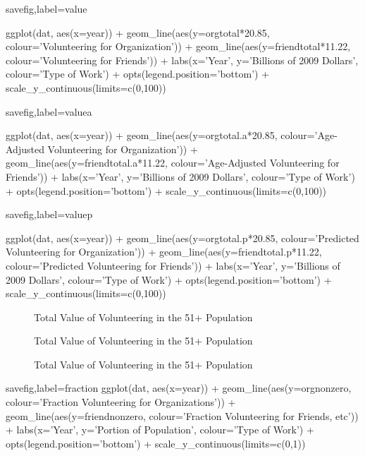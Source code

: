 \documentclass{article}
\begin{document}
\begin{Rcode}{savefig,label=value}

ggplot(dat, aes(x=year)) + 
geom_line(aes(y=orgtotal*20.85, colour='Volunteering for Organization')) + 
geom_line(aes(y=friendtotal*11.22, colour='Volunteering for Friends')) + 
labs(x='Year', y='Billions of 2009 Dollars', colour='Type of Work') + opts(legend.position='bottom') +
scale_y_continuous(limits=c(0,100))
\end{Rcode}

\begin{Rcode}{savefig,label=valuea}

ggplot(dat, aes(x=year)) + 
geom_line(aes(y=orgtotal.a*20.85, colour='Age-Adjusted Volunteering for Organization')) + 
geom_line(aes(y=friendtotal.a*11.22, colour='Age-Adjusted Volunteering for Friends')) + 
labs(x='Year', y='Billions of 2009 Dollars', colour='Type of Work') + opts(legend.position='bottom') +
scale_y_continuous(limits=c(0,100))
\end{Rcode}

\begin{Rcode}{savefig,label=valuep}

ggplot(dat, aes(x=year)) + 
geom_line(aes(y=orgtotal.p*20.85, colour='Predicted Volunteering for Organization')) + 
geom_line(aes(y=friendtotal.p*11.22, colour='Predicted Volunteering for Friends')) + 
labs(x='Year', y='Billions of 2009 Dollars', colour='Type of Work') + opts(legend.position='bottom') +
scale_y_continuous(limits=c(0,100))
\end{Rcode}

\begin{figure}[ht]
\centering
{}
\caption{Total Value of Volunteering in the 51+ Population}
\end{figure}

\begin{figure}[ht]
\centering
{}
\caption{Total Value of Volunteering in the 51+ Population}
\end{figure}

\begin{figure}[ht]
\centering
{}
\caption{Total Value of Volunteering in the 51+ Population}
\end{figure}

\begin{Rcode}{savefig,label=fraction}
ggplot(dat, aes(x=year)) +
geom_line(aes(y=orgnonzero, colour='Fraction Volunteering for Organizations')) +
geom_line(aes(y=friendnonzero, colour='Fraction Volunteering for Friends, etc')) + 
labs(x='Year', y='Portion of Population', colour='Type of Work') + opts(legend.position='bottom') +
scale_y_continuous(limits=c(0,1))
\end{Rcode}
\end{document}
